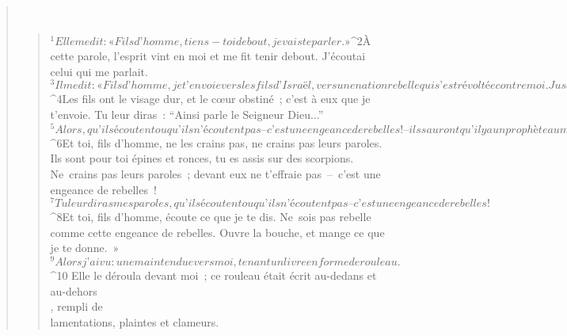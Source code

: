 \begin{verse}
         
      \bchapter{}
      \begin{verse}
${}^{1}Elle me dit : « Fils d’homme, tiens-toi debout, je vais te parler. » 
${}^{2}À cette parole, l’esprit vint en moi et me fit tenir debout. J’écoutai celui qui me parlait. 
${}^{3}Il me dit : « Fils d’homme, je t’envoie vers les fils d’Israël, vers une nation rebelle qui s’est révoltée contre moi. Jusqu’à ce jour, eux et leurs pères se sont soulevés contre moi. 
${}^{4}Les fils ont le visage dur, et le cœur obstiné ; c’est à eux que je t’envoie. Tu leur diras : “Ainsi parle le Seigneur Dieu...” 
${}^{5}Alors, qu’ils écoutent ou qu’ils n’écoutent pas – c’est une engeance de rebelles ! – ils sauront qu’il y a un prophète au milieu d’eux. 
${}^{6}Et toi, fils d’homme, ne les crains pas, ne crains pas leurs paroles. Ils sont pour toi épines et ronces, tu es assis sur des scorpions. Ne crains pas leurs paroles ; devant eux ne t’effraie pas – c’est une engeance de rebelles ! 
${}^{7}Tu leur diras mes paroles, qu’ils écoutent ou qu’ils n’écoutent pas – c’est une engeance de rebelles ! 
${}^{8}Et toi, fils d’homme, écoute ce que je te dis. Ne sois pas rebelle comme cette engeance de rebelles. Ouvre la bouche, et mange ce que je te donne. »
${}^{9}Alors j’ai vu : une main tendue vers moi, tenant un livre en forme de rouleau. 
${}^{10} Elle le déroula devant moi ; ce rouleau était écrit au-dedans et au-dehors\\, rempli de\\lamentations, plaintes et clameurs.
      

\end{verse}
\end{verse}
